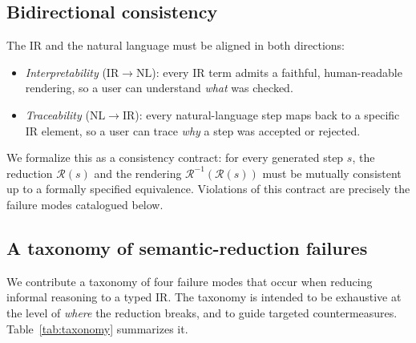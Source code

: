 \documentclass[11pt,a4paper]{article}
\theoremstyle{definition}
\theoremstyle{plain}
\begin{document}
\subsection{Bidirectional consistency}
\label{sec:bidirectional}

The IR and the natural language must be aligned in both directions:
\begin{itemize}[leftmargin=*]
  \item \emph{Interpretability} ($\mathrm{IR}\rightarrow\mathrm{NL}$): every IR term admits a faithful,
  human-readable rendering, so a user can understand \emph{what} was checked.
  \item \emph{Traceability} ($\mathrm{NL}\rightarrow\mathrm{IR}$): every natural-language step maps back
  to a specific IR element, so a user can trace \emph{why} a step was accepted or rejected.
\end{itemize}
We formalize this as a consistency contract: for every generated step $s$, the reduction
$\mathcal{R}(s)$ and the rendering $\mathcal{R}^{-1}(\mathcal{R}(s))$ must be mutually consistent up to a
formally specified equivalence. Violations of this contract are precisely the failure modes catalogued
below.

\subsection{A taxonomy of semantic-reduction failures}
\label{sec:taxonomy}

We contribute a taxonomy of four failure modes that occur when reducing informal reasoning to a typed
IR. The taxonomy is intended to be exhaustive at the level of \emph{where} the reduction breaks, and to
guide targeted countermeasures. Table~\ref{tab:taxonomy} summarizes it.
\end{document}
